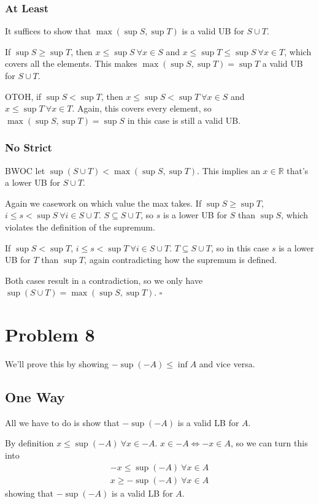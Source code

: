 \documentclass[12pt]{article}
\begin{document}
\subsubsection{At Least}

It suffices to show that $\max(\sup S, \sup T)$ is a valid UB for $S \cup T$.

If $\sup S \ge \sup T$, then $x \le \sup S\ \forall x \in S$ and $x \le \sup T \le \sup S\ \forall x \in T$,
which covers all the elements.
This makes $\max(\sup S, \sup T)=\sup T$ a valid UB for $S \cup T$.

OTOH, if $\sup S < \sup T$, then $x \le \sup S < \sup T\ \forall x \in S$ and $x \le \sup T\ \forall x \in T$.
Again, this covers every element, so $\max(\sup S, \sup T)=\sup S$ in this case is still a valid UB.

\subsubsection{No Strict}

BWOC let $\sup(S \cup T) < \max(\sup S, \sup T)$.
This implies an $x \in \mathbb{R}$ that's a lower UB for $S \cup T$.

Again we casework on which value the max takes.
If $\sup S \ge \sup T$, $i \le s < \sup S\ \forall i \in S \cup T$.
$S \subseteq S \cup T$, so $s$ is a lower UB for $S$ than $\sup S$, which violates the
definition of the supremum.

If $\sup S < \sup T$, $i \le s < \sup T\ \forall i \in S \cup T$.
$T \subseteq S \cup T$, so in this case $s$ is a lower UB for $T$ than $\sup T$,
again contradicting how the supremum is defined.

Both cases result in a contradiction, so we only have $\sup(S \cup T)=\max(\sup S, \sup T)$. $\square$

\pagebreak

\section{Problem 8}

We'll prove this by showing $-\sup(-A) \le \inf A$ and vice versa.

\subsection{One Way}

All we have to do is show that $-\sup(-A)$ is a valid LB for $A$.

By definition $x \le \sup(-A)\ \forall x \in -A$.
$x \in -A \iff -x \in A$, so we can turn this into
\begin{gather*}
      -x \le \sup(-A)\ \forall x \in A \\
      x \ge -\sup(-A)\ \forall x \in A
\end{gather*}
showing that $-\sup(-A)$ is a valid LB for $A$.
\end{document}

